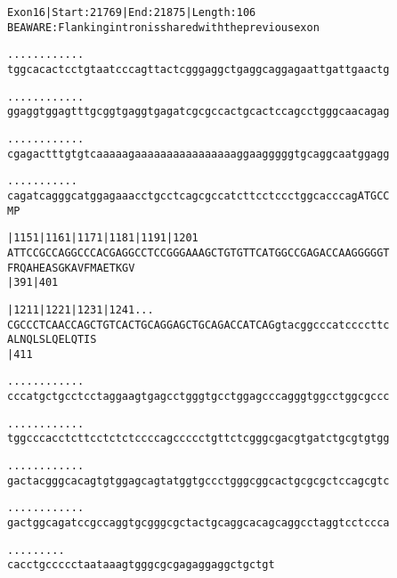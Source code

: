 \documentclass{article}
\begin{document}
\begin{alltt}
Exon 16 | Start: 21769 | End: 21875 | Length: 106
BE AWARE: Flanking intron is shared with the previous exon

.    .    .    .    .    .    .    .    .    .    .    .    
tggcacactcctgtaatcccagttactcgggaggctgaggcaggagaattgattgaactg

.    .    .    .    .    .    .    .    .    .    .    .    
ggaggtggagtttgcggtgaggtgagatcgcgccactgcactccagcctgggcaacagag

.    .    .    .    .    .    .    .    .    .    .    .    
cgagactttgtgtcaaaaagaaaaaaaaaaaaaaaaggaagggggtgcaggcaatggagg

.    .    .    .    .    .    .    .    .    .    .         
cagatcagggcatggagaaacctgcctcagcgccatcttcctccctggcacccagATGCC
                                                       M  P 

  |1151     |1161     |1171     |1181     |1191     |1201   
ATTCCGCCAGGCCCACGAGGCCTCCGGGAAAGCTGTGTTCATGGCCGAGACCAAGGGGGT
 F  R  Q  A  H  E  A  S  G  K  A  V  F  M  A  E  T  K  G  V 
                      |391                          |401    

  |1211     |1221     |1231     |1241         .    .    .   
CGCCCTCAACCAGCTGTCACTGCAGGAGCTGCAGACCATCAGgtacggcccatccccttc
 A  L  N  Q  L  S  L  Q  E  L  Q  T  I  S                   
                      |411                                  

 .    .    .    .    .    .    .    .    .    .    .    .   
cccatgctgcctcctaggaagtgagcctgggtgcctggagcccagggtggcctggcgccc

 .    .    .    .    .    .    .    .    .    .    .    .   
tggcccacctcttcctctctccccagccccctgttctcgggcgacgtgatctgcgtgtgg

 .    .    .    .    .    .    .    .    .    .    .    .   
gactacgggcacagtgtggagcagtatggtgccctgggcggcactgcgcgctccagcgtc

 .    .    .    .    .    .    .    .    .    .    .    .   
gactggcagatccgccaggtgcgggcgctactgcaggcacagcaggcctaggtcctccca

 .    .    .    .    .    .    .    .    .
cacctgccccctaataaagtgggcgcgagaggaggctgctgt
\end{alltt}
\newpage
\end{document}
